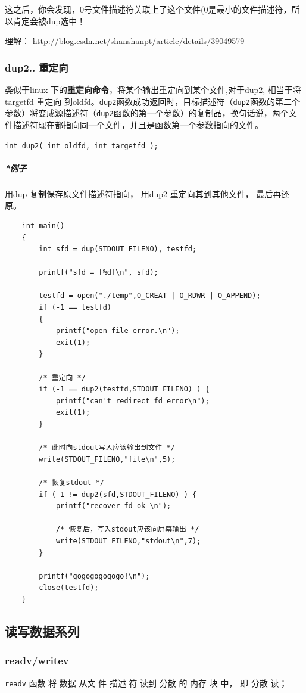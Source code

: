 \documentclass[UTF8,a4paper,8pt]{ctexbook}
\begin{document}
				这之后，你会发现，0号文件描述符关联上了这个文件(0是最小的文件描述符，所以肯定会被dup选中！
				
				理解： \url{http://blog.csdn.net/shanshanpt/article/details/39049579}
				
			\subsubsection{dup2.. 重定向}
				类似于linux 下的\textbf{重定向命令}，将某个输出重定向到某个文件,对于dup2, 相当于将targetfd 重定向 到oldfd。\verb|dup2|函数成功返回时，目标描述符（\verb|dup2|函数的第二个参数）将变成源描述符（\verb|dup2|函数的第一个参数）的复制品，换句话说，两个文件描述符现在都指向同一个文件，并且是函数第一个参数指向的文件。
				
				\verb|int dup2( int oldfd, int targetfd );|
				
				\subparagraph{*例子} 用dup 复制保存原文件描述符指向， 用dup2 重定向其到其他文件， 最后再还原。
					\begin{lstlisting}
	int main()  
	{  
		int sfd = dup(STDOUT_FILENO), testfd;  
		
		printf("sfd = [%d]\n", sfd);  
		
		testfd = open("./temp",O_CREAT | O_RDWR | O_APPEND);  
		if (-1 == testfd)  
		{  
			printf("open file error.\n");  
			exit(1);  
		}  
		
		/* 重定向 */  
		if (-1 == dup2(testfd,STDOUT_FILENO) ) {  
			printf("can't redirect fd error\n");  
			exit(1);  
		}  
		
		/* 此时向stdout写入应该输出到文件 */  
		write(STDOUT_FILENO,"file\n",5);  
		
		/* 恢复stdout */  
		if (-1 != dup2(sfd,STDOUT_FILENO) ) {  
			printf("recover fd ok \n");  
			
			/* 恢复后，写入stdout应该向屏幕输出 */  
			write(STDOUT_FILENO,"stdout\n",7);  
		}  
		
		printf("gogogogogogo!\n");  
		close(testfd);  
	}  
					\end{lstlisting}
				
		\subsection{读写数据系列}
			\subsubsection{readv/writev}
				\verb|readv| 函数 将 数据 从文 件 描述 符 读到 分散 的 内存 块 中， 即 分散 读； 
				
\end{document}
